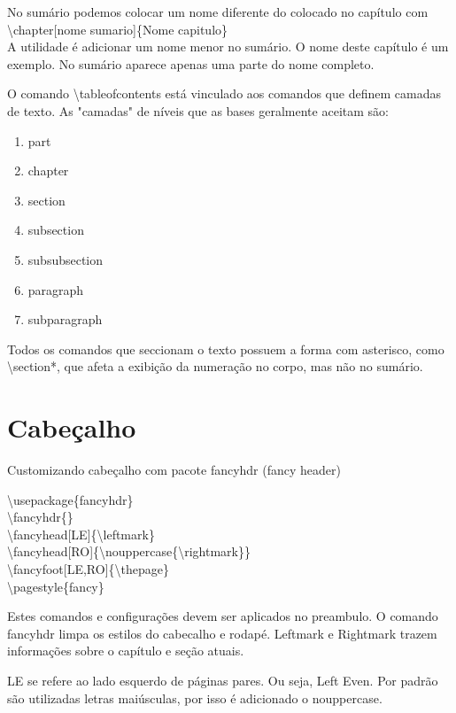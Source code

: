 No sumário podemos colocar um nome diferente do colocado no capítulo com \\
\textbackslash chapter[nome sumario]\{Nome capitulo\} \\
A utilidade é adicionar um nome menor no sumário.
O nome deste capítulo é um exemplo.
No sumário aparece apenas uma parte do nome completo.

O comando \textbackslash tableofcontents está vinculado aos comandos que definem camadas de texto.
As "camadas" de níveis que as bases geralmente aceitam são:
\begin{multicols}{2}
\begin{enumerate}
    \item part
    \item chapter
    \item section
    \item subsection
    \item subsubsection
    \item paragraph
    \item subparagraph
\end{enumerate}
\end{multicols}

Todos os comandos que seccionam o texto possuem a forma
com asterisco, como \textbackslash section*, que afeta a exibição
da numeração no corpo, mas não no sumário.

\section{Cabeçalho}
Customizando cabeçalho com pacote fancyhdr (fancy header)

\noindent \textbackslash usepackage\{fancyhdr\}\\
\textbackslash fancyhdr\{\} \\
\textbackslash fancyhead[LE]\{\textbackslash leftmark\} \\
\textbackslash fancyhead[RO]\{\textbackslash nouppercase\{\textbackslash rightmark\}\} \\
\textbackslash fancyfoot[LE,RO]\{\textbackslash thepage\} \\
\textbackslash pagestyle\{fancy\} 

Estes comandos e configurações devem ser aplicados no preambulo.
O comando fancyhdr limpa os estilos do cabecalho e rodapé.
Leftmark e Rightmark trazem informações sobre o capítulo e seção atuais.

LE se refere ao lado esquerdo de páginas pares.
Ou seja, Left Even.
Por padrão são utilizadas letras maiúsculas, por isso é adicionado o nouppercase.

